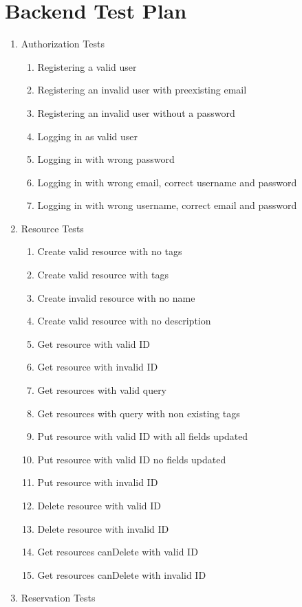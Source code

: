 \documentclass[12pt]{article}
\begin{document}
\section{Backend Test Plan}
\label{appendix:backendtest}
\begin{enumerate}
	\item Authorization Tests
	\begin{enumerate}
		\item Registering a valid user
		\item Registering an invalid user with preexisting email
		\item Registering an invalid user without a password
		\item Logging in as valid user
		\item Logging in with wrong password
		\item Logging in with wrong email, correct username and password
		\item Logging in with wrong username, correct email and password
	\end{enumerate}
	\item Resource Tests
	\begin{enumerate}
		\item Create valid resource with no tags
		\item Create valid resource with tags
		\item Create invalid resource with no name
		\item Create valid resource with no description 
		\item Get resource with valid ID
		\item Get resource with invalid ID
		\item Get resources with valid query
		\item Get resources with query with non existing tags
		\item Put resource with valid ID with all fields updated
		\item Put resource with valid ID no fields updated
		\item Put resource with invalid ID
		\item Delete resource with valid ID
		\item Delete resource with invalid ID
		\item Get resources canDelete with valid ID
		\item Get resources canDelete with invalid ID
	\end{enumerate}
	\item Reservation Tests

\end{enumerate}
\end{document}
